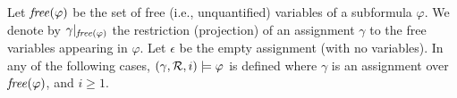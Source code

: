 Let $\mathit{free} ( \varphi )$ be the set of free (i.e., unquantified) variables of a
subformula $\varphi$. 
We denote by $\gamma |_{\mathit{free} ( \varphi )}$ the restriction (projection) of
an assignment $\gamma$ to the free variables appearing in $\varphi$.
%
Let $\epsilon$ be the empty assignment (with no variables). 
%
In any of the following cases, $( \gamma,  {\cal R} , i ) \models \varphi$
is defined where $\gamma$ is an
assignment over $\mathit{free} ( \varphi )$, and $i\ge 1$.

